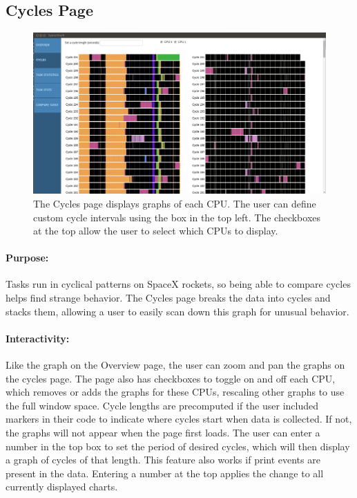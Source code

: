 \documentclass{hmcclinic}
\begin{document}
  \subsection{Cycles Page} %

  \begin{figure}[H]
  \centering
      \includegraphics[width=5in]{cycles-page.png}
  \caption{The Cycles page displays graphs of each CPU. The user can define
  custom cycle intervals using the box in the top left. The checkboxes at the
top allow the user to select which CPUs to display.}
  \end{figure}
  
  \paragraph{Purpose:}Tasks run in cyclical patterns on SpaceX rockets, so being
  able to compare cycles helps find strange behavior. The Cycles page breaks the
  data into cycles and stacks them, allowing a user to easily scan down this
  graph for unusual behavior.

\paragraph{Interactivity:}    
    Like the graph on the Overview page, the user can zoom and pan the graphs on
    the cycles page.  The page also has checkboxes to toggle on and off each
    CPU, which removes or adds the graphs for these CPUs, rescaling other graphs
    to use the full window space. Cycle lengths are precomputed if the user
    included markers in their code to indicate where cycles start when data is
    collected.  If not, the graphs will not appear when the page first loads.
    The user can enter a number in the top box to set the period of desired
    cycles, which will then display a graph of cycles of that length. This
    feature also works  if print events are present in the data.  Entering a
    number at the top applies the change to all currently displayed charts.
        
\end{document}
